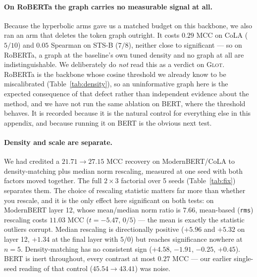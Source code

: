 \documentclass{article}
\begin{document}
\paragraph{On RoBERTa the graph carries no measurable signal at all.} Because
the hyperbolic arms gave us a matched budget on this backbone, we also ran an
arm that deletes the token graph outright. It costs $0.29$ MCC on CoLA ($5/10$)
and $0.05$ Spearman on STS-B ($7/8$), neither close to significant --- so on
RoBERTa, a graph at the baseline's own tuned density and no graph at all are
indistinguishable. We deliberately do \emph{not} read this as a verdict on
\textsc{Glot}. RoBERTa is the backbone whose cosine threshold we already know to
be miscalibrated (Table~\ref{tab:density}), so an uninformative graph here is
the expected consequence of that defect rather than independent evidence about
the method, and we have not run the same ablation on BERT, where the threshold
behaves. It is recorded because it is the natural control for everything else in
this appendix, and because running it on BERT is the obvious next test.

\paragraph{Density and scale are separate.} We had credited a $21.71 \rightarrow
27.15$ MCC recovery on ModernBERT/CoLA to density-matching plus median norm
rescaling, measured at one seed with both factors moved together. The full
$2\times3$ factorial over 5 seeds (Table~\ref{tab:fix}) separates them. The
choice of rescaling statistic matters far more than whether you rescale, and it
is the only effect here significant on both tests: on ModernBERT layer 12, whose
mean/median norm ratio is $7.66$, mean-based (\texttt{rms}) rescaling costs
$11.03$ MCC ($t=-5.47$, $0/5$) --- the mean is exactly the statistic outliers
corrupt. Median rescaling is directionally positive ($+5.96$ and $+5.32$ on
layer 12, $+1.34$ at the final layer with $5/0$) but reaches significance
nowhere at $n=5$. Density-matching has no consistent sign ($+4.58$, $-1.91$,
$-0.25$, $+0.45$). BERT is inert throughout, every contrast at most $0.27$ MCC
--- our earlier single-seed reading of that control ($45.54 \rightarrow 43.41$)
was noise.
\end{document}
